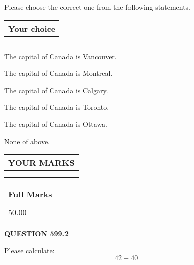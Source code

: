 \documentclass[12pt]{article}
\begin{document}
  
Please choose the correct one from the following statements.
  
  
\noindent\hspace{3.0in} \begin{tabular}{|l|}
\hline
Your choice \\
\hline
 \\ 
 \\ 
\hline
\end{tabular}
  
  
 
 
The capital of Canada is Vancouver.
 
 
The capital of Canada is Montreal.
 
 
The capital of Canada is Calgary.
 
 
The capital of Canada is Toronto.
 
 
The capital of Canada is Ottawa.
 
 
 None of above.
 
 
  
\vspace{0.2in}
  
\noindent\begin{tabular}{|l|}
\hline
 YOUR MARKS  \\
\hline
 \\ 
 \\ 
\hline
\end{tabular}
\hspace{0.05in} \begin{tabular}{|l|}
\hline
 Full Marks  \\
\hline
 \\ 
50.00 \\
\hline
\end{tabular}
{\textbf{\Large{QUESTION
599.2 
}}}
  
  
 
Please calculate:
\begin{equation}
42 +  %
40 = \nonumber
\end{equation}
 

 

 
   
   
 \vspace{0.2in}
 
   
   
   
   
\end{document}
